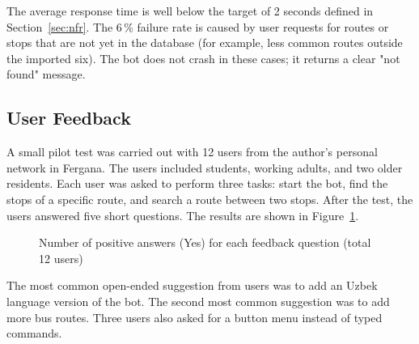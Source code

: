 The average response time is well below the target of 2 seconds defined in
Section~\ref{sec:nfr}. The 6\,\% failure rate is caused by user requests
for routes or stops that are not yet in the database (for example, less
common routes outside the imported six). The bot does not crash in these
cases; it returns a clear "not found" message.

\subsection{User Feedback}
\label{subsec:feedback}

A small pilot test was carried out with 12 users from the author's personal
network in Fergana. The users included students, working adults, and two
older residents. Each user was asked to perform three tasks: start the bot,
find the stops of a specific route, and search a route between two stops.
After the test, the users answered five short questions. The results are
shown in Figure~\ref{fig:feedback}.

\begin{figure}[h]
\centering
{}
\caption{Number of positive answers (Yes) for each feedback question
    (total 12 users)}
\label{fig:feedback}
\end{figure}

The most common open-ended suggestion from users was to add an Uzbek
language version of the bot. The second most common suggestion was to add
more bus routes. Three users also asked for a button menu instead of typed
commands.


